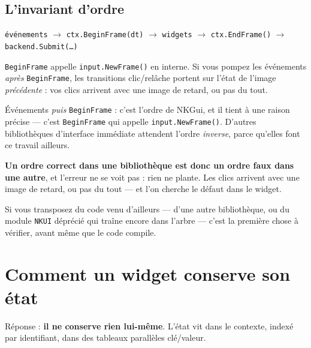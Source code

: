 \subsection{L'invariant d'ordre}

\begin{nkretenir}
\begin{center}
\texttt{événements} $\rightarrow$ \texttt{ctx.BeginFrame(dt)} $\rightarrow$
\texttt{widgets} $\rightarrow$ \texttt{ctx.EndFrame()} $\rightarrow$
\texttt{backend.Submit(\dots)}
\end{center}

\texttt{BeginFrame} appelle \texttt{input.NewFrame()} en interne. Si vous pompez
les événements \emph{après} \texttt{BeginFrame}, les transitions clic/relâche
portent sur l'état de l'image \emph{précédente} : vos clics arrivent avec une
image de retard, ou pas du tout.
\end{nkretenir}

\begin{nkpiege}
Événements \emph{puis} \texttt{BeginFrame} : c'est l'ordre de NKGui, et il
tient à une raison précise --- c'est \texttt{BeginFrame} qui appelle
\texttt{input.NewFrame()}. D'autres bibliothèques d'interface immédiate
attendent l'ordre \emph{inverse}, parce qu'elles font ce travail ailleurs.

\textbf{Un ordre correct dans une bibliothèque est donc un ordre faux dans une
autre}, et l'erreur ne se voit pas : rien ne plante. Les clics arrivent avec une
image de retard, ou pas du tout --- et l'on cherche le défaut dans le widget.

Si vous transposez du code venu d'ailleurs --- d'une autre bibliothèque, ou du
module \texttt{NKUI} déprécié qui traîne encore dans l'arbre --- c'est la
première chose à vérifier, avant même que le code compile.
\end{nkpiege}

\section{Comment un widget conserve son état}

Réponse : \textbf{il ne conserve rien lui-même}. L'état vit dans le contexte,
indexé par identifiant, dans des tableaux parallèles clé/valeur.

